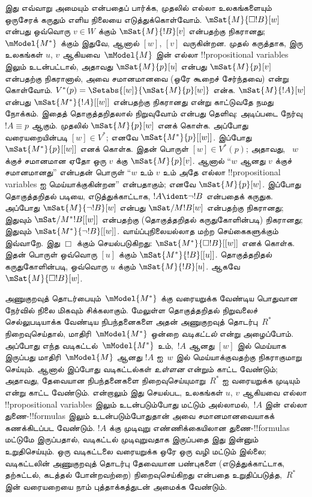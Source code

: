 \documentclass[../../../include/open-logic-section]{subfiles}
\begin{document}
இது எவ்வாறு அமையும் என்பதைப் பார்க்க, முதலில் எல்லா உலகங்களையும் ஒருசேரக்
கருதும் எளிய நிலையை எடுத்துக்கொள்வோம். $\mSat{M}{\Box !B}[w]$ என்பது
ஒவ்வொரு $v \in W$ க்கும் $\mSat{M}{!B}[v]$ என்பதற்கு நிகரானது;
$\mModel{M^*}$ க்கும் இதுவே, ஆனால் $[w]$, $[v]$ வருகின்றன.
முதல் கருத்தாக, இரு உலகங்கள் $u$, $v$ ஆகியவை~$\mModel{M}$ இன் எல்லா
!!{propositional variable}s இலும் உடன்பட்டால், அதாவது
$\mSat{M}{p}[u]$ என்பது $\mSat{M}{p}[v]$ என்பதற்கு நிகரானால், அவை சமானமானவை
(ஒரே கூறைச் சேர்ந்தவை) என்று கொள்வோம். $V^*(p) =
\Setabs{[w]}{\mSat{M}{p}[w]}$ என்க. $\mSat{M}{!A}[w]$ என்பது
$\mSat{M^*}{!A}[{[w]}]$ என்பதற்கு நிகரானது என்று காட்டுவதே நமது நோக்கம்.
இதைத் தொகுத்தறிதலால் நிறுவுவோம் என்பது தெளிவு: அடிப்படை நேர்வு
$!A \equiv p$ ஆகும். முதலில் $\mSat{M}{p}[w]$ எனக் கொள்க. அப்போது
வரையறையின்படி $[w] \in V^*$; எனவே $\mSat{M^*}{p}[{[w]}]$. இப்போது
$\mSat{M^*}{p}[{[w]}]$ எனக் கொள்க. இதன் பொருள் $[w] \in V^*(p)$; அதாவது,
~$w$ க்குச் சமானமான ஏதோ ஒரு $v$ க்கு $\mSat{M}{p}[v]$. ஆனால் ``$w$ ஆனது
$v$ க்குச் சமானமானது'' என்பதன் பொருள் ``$w$ உம் $v$ உம் அதே எல்லா
!!{propositional variable}s ஐ மெய்யாக்குகின்றன'' என்பதாகும்; எனவே
$\mSat{M}{p}[w]$. இப்போது தொகுத்தறிதல் படியை, எடுத்துக்காட்டாக,
$!A \ident \lnot !B$ என்பதைக் கருதுக. அப்போது
$\mSat{M}{\lnot !B}[w]$ என்பது $\mSat/{M}{!B}[w]$ என்பதற்கு நிகரானது;
இதுவும் $\mSat/{M^*}{!B}[{[w]}]$ என்பதற்கு (தொகுத்தறிதல்
கருதுகோளின்படி) நிகரானது; இதுவும்
$\mSat{M^*}{\lnot !B}[{[w]}]$. வாய்ப்புநிலையல்லாத மற்ற செய்கைகளுக்கும்
இவ்வாறே. இது $\Box$ க்கும் செயல்படுகிறது: $\mSat{M^*}{\Box
  !B}[{[w]}]$ எனக் கொள்க. இதன் பொருள் ஒவ்வொரு $[u]$ க்கும்
$\mSat{M^*}{!B}[{[u]}]$. தொகுத்தறிதல் கருதுகோளின்படி, ஒவ்வொரு $u$ க்கும்
$\mSat{M}{!B}[u]$. ஆகவே $\mSat{M}{\Box !B}[w]$.

அணுகுறவுத் தொடர்பையும்~$\mModel{M^*}$ க்கு வரையறுக்க வேண்டிய பொதுவான
நேர்வில் நிலை மிகவும் சிக்கலாகும். மேலுள்ள தொகுத்தறிதல் நிறுவலைச் செல்லுபடியாக்க
வேண்டிய நிபந்தனைகளை அதன் அணுகுறவுத் தொடர்பு~$R^*$ நிறைவுசெய்தால்,
மாதிரி~$\mModel{M^*}$ ஒன்றை \emph{வடிகட்டல்} என்று அழைப்போம். அப்போது
எந்த வடிகட்டல்~$\mModel{M^*}$ உம்,~$!A$ ஆனது $[w]$ இல் மெய்யாக இருப்பது
மாதிரி~$\mModel{M}$ ஆனது $!A$ ஐ~$w$ இல் மெய்யாக்குவதற்கு நிகராகுமாறு
செய்யும்.
ஆனால் இப்போது வடிகட்டல்கள் \emph{உள்ளன} என்றும் காட்ட வேண்டும்; அதாவது,
தேவையான நிபந்தனைகளை நிறைவுசெய்யுமாறு~$R^*$ ஐ வரையறுக்க முடியும் என்று
காட்ட வேண்டும். என்றாலும் இது செயல்பட, உலகங்கள் $u$, $v$ ஆகியவை எல்லா
!!{propositional variable}s இலும் உடன்படும்போது மட்டும் அல்லாமல்,~$!A$ இன்
எல்லா துணை-!!{formula}s இலும் உடன்படும்போதுதான் அவை சமானமானவையாகக்
கணக்கிடப்பட வேண்டும். $!A$ க்கு முடிவுறு எண்ணிக்கையிலான துணை-!!{formula}s
மட்டுமே இருப்பதால், வடிகட்டல் முடிவுறுவதாக இருப்பதை இது இன்னும் உறுதிசெய்யும்.
ஒரு வடிகட்டலை வரையறுக்க ஒரே ஒரு வழி மட்டும் இல்லை; வடிகட்டலின் அணுகுறவுத்
தொடர்பு தேவையான பண்புகளை (எடுத்துக்காட்டாக, தற்சுட்டல், கடத்தல் போன்றவற்றை)
நிறைவுசெய்கிறது என்பதை உறுதிப்படுத்த,~$R^*$ இன் வரையறையை நாம்
புத்தாக்கத்துடன் அமைக்க வேண்டும்.
\end{document}
